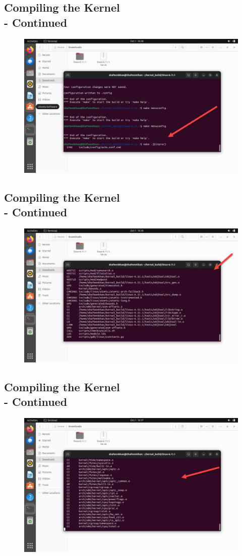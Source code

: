 \documentclass{article}
\begin{document}
\subsection{Compiling the Kernel \\-  Continued}
\begin{figure}[H]
    \centering
    \includegraphics[width=0.8\linewidth]{25.jpg}
    \caption{}
\end{figure}


\subsection{Compiling the Kernel \\-  Continued}
\begin{figure}[H]
    \centering
    \includegraphics[width=0.8\linewidth]{24.jpg}
    \caption{}
\end{figure}


\subsection{Compiling the Kernel \\-  Continued}
\begin{figure}[H]
    \centering
    \includegraphics[width=0.8\linewidth]{23.jpg}
    \caption{}
\end{figure}
\end{document}
